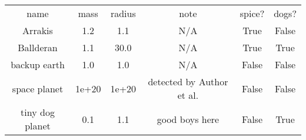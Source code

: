\begin{table}
\begin{tabular}{cccccc}
name & mass & radius & note & spice? & dogs? \\
Arrakis & 1.2 & 1.1 & N/A & True & False \\
Ballderan & 1.1 & 30.0 & N/A & True & True \\
backup earth & 1.0 & 1.0 & N/A & False & False \\
space planet & 1e+20 & 1e+20 & detected by Author et al. & False & False \\
tiny dog planet & 0.1 & 1.1 & good boys here & False & True \\
\end{tabular}
\end{table}
